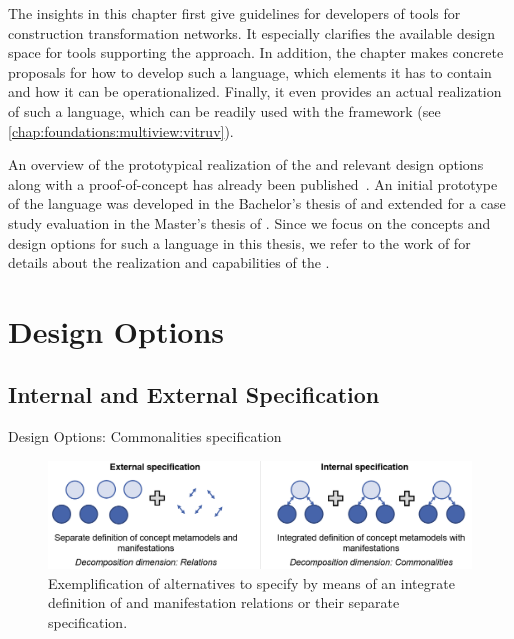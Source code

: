 
The insights in this chapter first give guidelines for developers of tools for construction transformation networks.
It especially clarifies the available design space for tools supporting the \commonalities approach.
In addition, the chapter makes concrete proposals for how to develop such a language, which elements it has to contain and how it can be operationalized.
Finally, it even provides an actual realization of such a language, which can be readily used with the \vitruv framework (see \autoref{chap:foundations:multiview:vitruv}).

An overview of the prototypical realization of the \commonalitieslanguage and relevant design options along with a proof-of-concept has already been published~.
An initial prototype of the language was developed in the Bachelor's thesis of  and extended for a case study evaluation in the Master's thesis of .
Since we focus on the concepts and design options for such a language in this thesis, we refer to the work of  for details about the realization and capabilities of the \commonalitieslanguage.



\section{Design Options}

\subsection{Internal and External Specification}

Design Options: Commonalities specification

\begin{figure}
    \centering
    \includegraphics[width=\textwidth]{figures/quality/language/design_options.png}
    \caption[Design options for \commonalities specification]{Exemplification of alternatives to specify \commonalities by means of an integrate definition of \conceptmetamodels and manifestation relations or their separate specification.}
    \label{fig:language:design_options}
\end{figure}


